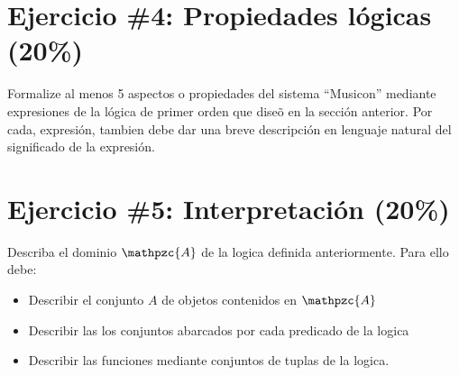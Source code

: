 \documentclass{article}
\begin{document}
\section*{Ejercicio \#4: Propiedades l\'ogicas (20\%)}
Formalize al menos 5 aspectos o propiedades del sistema ``Musicon'' mediante expresiones
de la l\'ogica de primer orden que dise\~o en la secci\'on anterior. Por cada,
expresi\'on, tambien debe dar una breve descripci\'on en lenguaje natural
del significado de la expresi\'on.

\section*{Ejercicio \#5: Interpretaci\'on (20\%)}
Describa el dominio $\mathpzc{A}$ de la logica definida anteriormente. Para ello debe:
\begin{itemize}
        \item{Describir el conjunto $A$ de objetos contenidos en $\mathpzc{A}$}
        \item{Describir las los conjuntos abarcados por cada predicado de la logica}
        \item{Describir las funciones mediante conjuntos de tuplas de la logica.}
\end{itemize}



\end{document}
